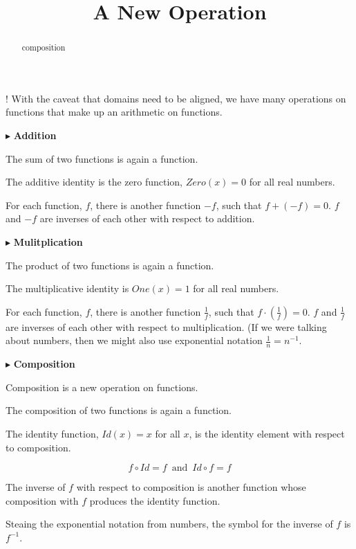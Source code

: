 \documentclass{ximera}
\title{A New Operation}
\begin{document}
\begin{abstract}
composition
\end{abstract}
\maketitle





{\Huge !} With the caveat that domains need to be aligned, we have many operations on functions that make up an arithmetic on functions.




$\blacktriangleright$ \textbf{Addition} 

The sum of two functions is again a function. 

The additive identity is the zero function, $Zero(x) = 0$ for all real numbers.

For each function, $f$, there is another function $-f$, such that $f + (-f) = 0$.   $f$ and $-f$ are inverses of each other with respect to addition.




$\blacktriangleright$ \textbf{Mulitplication} 

The product of two functions is again a function.  

The multiplicative identity is $One(x) = 1$ for all real numbers.

For each function, $f$, there is another function $\frac{1}{f}$, such that $f \cdot \left( \frac{1}{f} \right) = 0$.   $f$ and $\frac{1}{f}$ are inverses of each other with respect to multiplication.  (If we were talking about numbers, then we might also use exponential notation $\frac{1}{n} = n^{-1}$.


$\blacktriangleright$ \textbf{Composition} 

Composition is a new operation on functions.

The composition of two functions is again a function. 

The identity function, $Id(x) = x$ for all $x$, is the identity element with respect to composition.



\[   f \circ Id = f    \, \text{ and } \, Id \circ f = f        \]



The inverse of $f$ with respect to composition is another function whose composition with $f$ produces the identity function.

Steaing the exponential notation from numbers, the symbol for the inverse of $f$ is $f^{-1}$.
\end{document}
